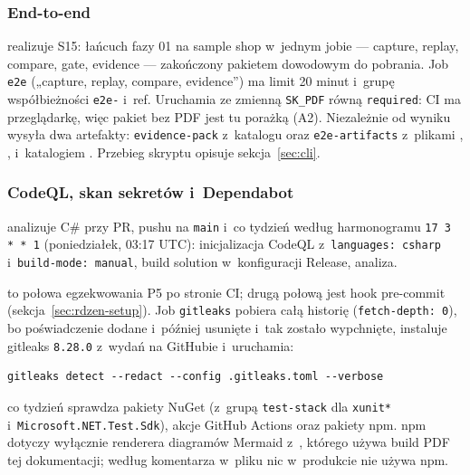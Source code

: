 \subsubsection{End-to-end}

 realizuje S15: łańcuch fazy 01 na sample shop w~jednym jobie --- capture,
replay, compare, gate, evidence --- zakończony pakietem dowodowym do pobrania. Job
\texttt{e2e} („capture, replay, compare, evidence”) ma limit 20 minut i~grupę
współbieżności \texttt{e2e-} i~ref. Uruchamia  ze zmienną
\texttt{SK\_PDF} równą \texttt{required}: CI ma przeglądarkę, więc pakiet bez PDF jest tu
porażką (A2). Niezależnie od wyniku wysyła dwa artefakty: \texttt{evidence-pack} z~katalogu
 oraz \texttt{e2e-artifacts} z~plikami
, ,
 i~katalogiem . Przebieg
skryptu opisuje sekcja~\ref{sec:cli}.

\subsubsection{CodeQL, skan sekretów i~Dependabot}

 analizuje C\# przy PR, pushu na \texttt{main} i~co tydzień według
harmonogramu \texttt{17 3 * * 1} (poniedziałek, 03:17 UTC): inicjalizacja CodeQL z~\texttt{languages: csharp} i~\texttt{build-mode: manual}, build solution w~konfiguracji
Release, analiza.

 to połowa egzekwowania P5 po stronie CI; drugą połową jest hook
pre-commit (sekcja~\ref{sec:rdzen-setup}). Job \texttt{gitleaks} pobiera całą historię
(\texttt{fetch-depth: 0}), bo poświadczenie dodane i~później usunięte i~tak zostało
wypchnięte, instaluje gitleaks \texttt{8.28.0} z~wydań na GitHubie i~uruchamia:

\begin{lstlisting}
gitleaks detect --redact --config .gitleaks.toml --verbose
\end{lstlisting}

 co tydzień sprawdza pakiety NuGet (z~grupą
\texttt{test-stack} dla \texttt{xunit*} i~\texttt{Microsoft.NET.Test.Sdk}), akcje GitHub
Actions oraz pakiety npm. npm dotyczy wyłącznie renderera diagramów Mermaid
z~, którego używa build PDF tej dokumentacji; według komentarza w~pliku
nic w~produkcie nie używa npm.

